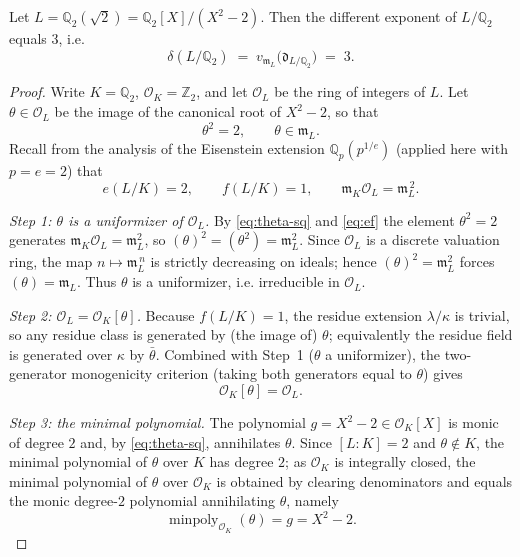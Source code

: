 \begin{theorem}
Let $L = \mathbb{Q}_2(\sqrt2) = \mathbb{Q}_2[X]/(X^2-2)$. Then the different
exponent of $L/\mathbb{Q}_2$ equals $3$, i.e.
\[
  \delta(L/\mathbb{Q}_2)
  \;=\; v_{\mathfrak{m}_L}\!\bigl(\mathfrak{d}_{L/\mathbb{Q}_2}\bigr)
  \;=\; 3 .
\]
\end{theorem}

\begin{proof}
Write $K = \mathbb{Q}_2$, $\mathcal{O}_K = \mathbb{Z}_2$, and let
$\mathcal{O}_L$ be the ring of integers of $L$. Let $\theta \in \mathcal{O}_L$
be the image of the canonical root of $X^2 - 2$, so that
\begin{equation}\label{eq:theta-sq}
  \theta^2 = 2,\qquad \theta \in \mathfrak{m}_L .
\end{equation}
Recall from the analysis of the Eisenstein extension $\mathbb{Q}_p(p^{1/e})$
(applied here with $p = e = 2$) that
\begin{equation}\label{eq:ef}
  e(L/K) = 2,\qquad f(L/K) = 1,\qquad \mathfrak{m}_K\mathcal{O}_L=\mathfrak{m}_L^{\,2}.
\end{equation}

\medskip
\noindent\emph{Step 1: $\theta$ is a uniformizer of $\mathcal{O}_L$.}
By \eqref{eq:theta-sq} and \eqref{eq:ef} the element $\theta^2 = 2$ generates
$\mathfrak{m}_K\mathcal{O}_L = \mathfrak{m}_L^{2}$, so
$(\theta)^2 = (\theta^2) = \mathfrak{m}_L^{2}$. Since $\mathcal{O}_L$ is a
discrete valuation ring, the map $n \mapsto \mathfrak{m}_L^{\,n}$ is strictly
decreasing on ideals; hence $(\theta)^2 = \mathfrak{m}_L^2$ forces
$(\theta) = \mathfrak{m}_L$. Thus $\theta$ is a uniformizer, i.e. irreducible in
$\mathcal{O}_L$.

\medskip
\noindent\emph{Step 2: $\mathcal{O}_L = \mathcal{O}_K[\theta]$.}
Because $f(L/K) = 1$, the residue extension $\lambda/\kappa$ is trivial, so any
residue class is generated by (the image of) $\theta$; equivalently the residue
field is generated over $\kappa$ by $\bar\theta$. Combined with Step~1
($\theta$ a uniformizer), the two-generator monogenicity criterion (taking both
generators equal to $\theta$) gives
\[
  \mathcal{O}_K[\theta] = \mathcal{O}_L .
\]

\medskip
\noindent\emph{Step 3: the minimal polynomial.}
The polynomial $g = X^2 - 2 \in \mathcal{O}_K[X]$ is monic of degree $2$ and,
by \eqref{eq:theta-sq}, annihilates $\theta$. Since $[L:K] = 2$ and
$\theta \notin K$, the minimal polynomial of $\theta$ over $K$ has degree $2$;
as $\mathcal{O}_K$ is integrally closed, the minimal polynomial of $\theta$ over
$\mathcal{O}_K$ is obtained by clearing denominators and equals the monic
degree-$2$ polynomial annihilating $\theta$, namely
\[
  \operatorname{minpoly}_{\mathcal{O}_K}(\theta) = g = X^2 - 2 .
\]


\end{proof}
